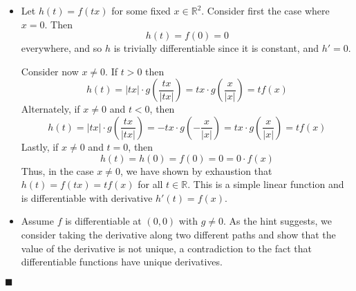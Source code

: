 \documentclass[12pt]{article}
\renewcommand{\qed}{\hfill$\blacksquare$}
\renewenvironment{proof}{\begin{addmargin}[1em]{0em}\begin{newproof}}{\end{newproof}\end{addmargin}\qed}
\begin{document}
\begin{proof}
\begin{itemize}
	\item Let $h\left(t\right) = f\left(tx\right)$ for some fixed $x\in \mathbb{R}^2$. Consider first the case where $x=0$. Then 
	$$ h\left(t\right) = f\left(0\right) = 0 $$ everywhere, and so $h$ is trivially differentiable since it is constant, and $h' = 0$.
	
	Consider now $x \neq 0$. If $t>0$ then 
	$$ h\left(t\right) = \left|tx\right| \cdot g\left( \frac{tx}{\left|tx\right|} \right)  = tx \cdot g\left( \frac{x}{\left|x\right|}\right) = t f\left(x\right) $$
	Alternately, if $x \neq 0$ and $t<0$, then
	$$ h\left(t\right) = \left|tx\right| \cdot g\left( \frac{tx}{\left|tx\right|} \right)  = -tx \cdot g\left( -\frac{x}{\left|x\right|}\right) = tx \cdot g\left( \frac{x}{\left|x\right|}\right) = t f\left(x\right) $$
	Lastly, if $x \neq 0$ and $t =0 $, then
	$$ h\left(t\right) = h\left(0\right) = f\left(0\right) = 0 = 0 \cdot f\left(x\right) $$
	Thus, in the case $x\neq 0$, we have shown by exhaustion that $h\left(t\right) = f\left(tx\right) = t f\left(x\right) $ for all $t \in \mathbb{R}$. This is a simple linear function and is differentiable with derivative $h'\left(t\right) = f\left(x\right)$.
	
	\item Assume $f$ is differentiable at $\left(0,0\right)$ with $g \neq 0$. As the hint suggests, we consider taking the derivative along two different paths and show that the value of the derivative is not unique, a contradiction to the fact that differentiable functions have unique derivatives.
	

\end{itemize}
\end{proof}
\end{document}
